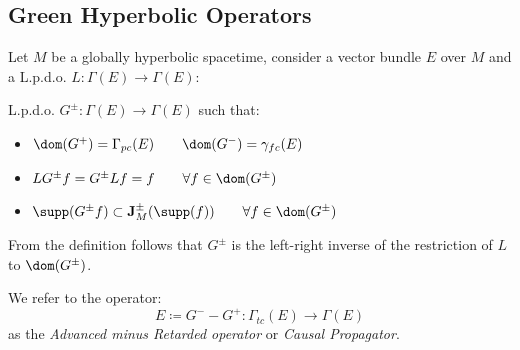 \documentclass[Main]{subfiles}
\begin{document}
		\subsection{Green Hyperbolic Operators}	
			Let $M$ be a globally hyperbolic spacetime, consider a vector bundle $E$ over $M$ and a L.p.d.o. $L: \Gamma(E) \rightarrow \Gamma(E)$:
			\begin{definition}\label{Def:GreenOperators}
				L.p.d.o. $G^\pm : \Gamma (E) \rightarrow \Gamma(E)$ such that:
				\begin{itemize}
					\item $\dom(G^+) = \Gamma_{pc}(E) \qquad \dom(G^-) = \gamma_{fc}(E)$
					\item $LG^\pm f=G^\pm Lf = f \qquad \forall f\in \dom(G^\pm)$
					\item $\supp(G^\pm f) \subset \mathbf{J}^\pm_M (\supp(f)) \qquad \forall f\in \dom(G^\pm)$
				\end{itemize}
			\end{definition}
			\begin{observation}
				From the definition follows that $G^\pm$ is the left-right inverse of the restriction of $L$ to $\dom(G^\pm)$.
			\end{observation}
			\begin{notationfix}
				We refer to the operator:
				\begin{displaymath}
					E \coloneqq G^-  - G^+ : \Gamma_{tc}(E) \rightarrow \Gamma(E)
				\end{displaymath}
				as the \emph{Advanced minus Retarded operator} or \emph{Causal Propagator}\cite{Benini2013}.
			\end{notationfix}		
		
\end{document}
